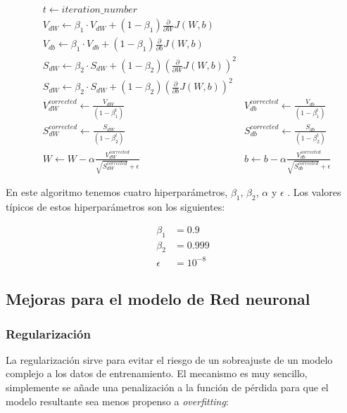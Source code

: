 \begin{align}
	&t \leftarrow iteration\_number\\
	&V_{dW} \leftarrow \beta_1 \cdot V_{dW} + (1 - \beta_1) \frac{\partial}{\partial W} J(W,b)\\
	&V_{db} \leftarrow \beta_1 \cdot V_{db} + (1 - \beta_1) \frac{\partial}{\partial b} J(W,b)\\
	&S_{dW} \leftarrow \beta_2 \cdot S_{dW} + (1 - \beta_2) \left( \frac{\partial}{\partial W} J(W,b) \right)^2\\
	&S_{dW} \leftarrow \beta_2 \cdot S_{dW} + (1 - \beta_2) \left( \frac{\partial}{\partial b} J(W,b) \right)^2\\
	&V_{dW}^{corrected} \leftarrow \frac{V_{dW}}{(1 - \beta_1^t)}
	&V_{db}^{corrected} \leftarrow \frac{V_{db}}{(1 - \beta_1^t)}\\
	&S_{dW}^{corrected} \leftarrow \frac{S_{dW}}{(1 - \beta_2^t)}
	&S_{db}^{corrected} \leftarrow \frac{S_{db}}{(1 - \beta_2^t)}\\
	&W \leftarrow W - \alpha \frac{V_{dW}^{corrected}}{\sqrt{S_{dW}^{corrected}} + \epsilon}
	& b \leftarrow b - \alpha \frac{V_{db}^{corrected}}{\sqrt{S_{db}^{corrected}} + \epsilon}
\end{align}

En este algoritmo tenemos cuatro hiperparámetros, $\beta_1$, $\beta_2$, $\alpha$ y $\epsilon$ \cite{kingma2017adam}. Los valores típicos de estos hiperparámetros son los siguientes:

\begin{align*}
	\beta_1 &= 0.9\\
	\beta_2 &= 0.999\\
	\epsilon &= 10^{-8}
\end{align*}

\subsection{Mejoras para el modelo de Red neuronal}

\subsubsection{Regularización}

La regularización sirve para evitar el riesgo de un sobreajuste de un modelo complejo a los datos de entrenamiento. El mecanismo es muy sencillo, simplemente se añade una penalización a la función de pérdida para que el modelo resultante sea menos propenso a \textit{overfitting}:

